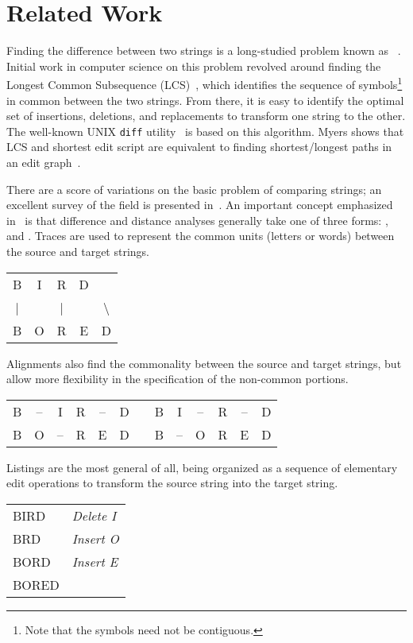 \section{Related Work}
\label{sec:diff-related}

Finding the difference between two strings is a long-studied problem
known as ~\cite{Wagner1974}.
Initial work in computer science on this problem revolved around finding the
Longest Common Subsequence (LCS)~\cite{Gusfield1999}, which identifies the
sequence of symbols\footnote{Note that the symbols need not be
contiguous.}
in common between the two strings.
From there, it is easy to identify the optimal
set of insertions, deletions, and replacements to transform
one string to the other.
The well-known UNIX \texttt{diff} utility~\cite{Hunt1976} is based
on this algorithm.
Myers shows that LCS and shortest edit script are equivalent to finding
shortest/longest paths in an edit graph~\cite{Myers1986}.

There are a score of variations on the basic problem of
comparing strings; an excellent survey of the field is
presented in~\cite{Sankoff1999}.
An important concept emphasized in~\cite{Sankoff1999} is that
difference and distance analyses generally take one of
three forms: ,  and .
Traces are used to represent the common units (\eg letters or words)
between the source and target strings.
\begin{center}
  \begin{tabular}{c c c c c}
B & I & R & D & \\
| &   & | &   & $\!\!\!\!\!\!\!\!\!\!$\textbackslash \\
B & O & R & E & D \\
  \end{tabular}
\end{center}
Alignments also find the commonality between the source and target
strings, but allow more flexibility in the specification of
the non-common portions.
\begin{center}
  \begin{tabular}{c c c c c c c c c c c c c}
B & -- & I & R & -- & D & \qquad\qquad & B & I & -- & R & -- & D \\
B & O & -- & R & E & D & \qquad\qquad  & B & -- & O & R & E & D \\
  \end{tabular}
\end{center}
Listings are the most general of all, being
organized as a sequence of elementary edit operations
to transform the source string into the target string.
\begin{center}
  \begin{tabular}{l l}
  BIRD & \textit{Delete I} \\
  BRD & \textit{Insert O} \\
  BORD & \textit{Insert E} \\
  BORED & \\
  \end{tabular}
\end{center}

